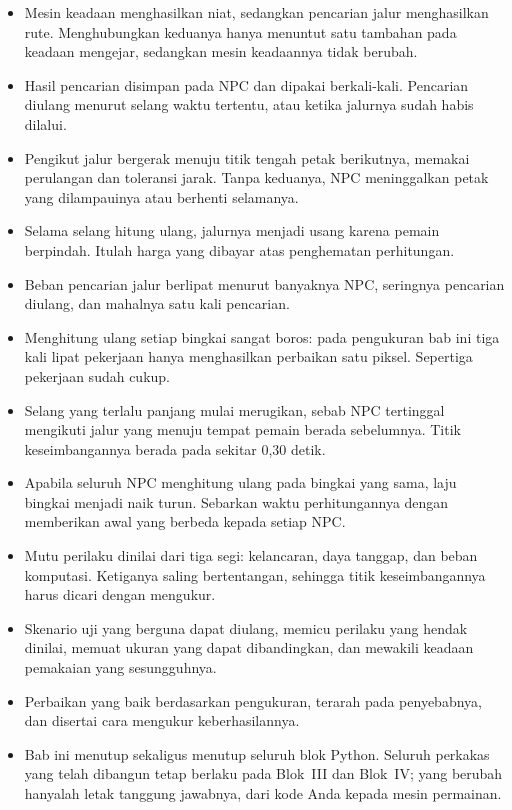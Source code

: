 
\begin{rangkumanbox}
\begin{itemize}
  \item Mesin keadaan menghasilkan niat, sedangkan pencarian jalur menghasilkan
        rute. Menghubungkan keduanya hanya menuntut satu tambahan pada keadaan
        mengejar, sedangkan mesin keadaannya tidak berubah.
  \item Hasil pencarian disimpan pada NPC dan dipakai berkali-kali. Pencarian
        diulang menurut selang waktu tertentu, atau ketika jalurnya sudah habis
        dilalui.
  \item Pengikut jalur bergerak menuju titik tengah petak berikutnya, memakai
        perulangan  dan toleransi jarak. Tanpa keduanya, NPC
        meninggalkan petak yang dilampauinya atau berhenti selamanya.
  \item Selama selang hitung ulang, jalurnya menjadi usang karena pemain
        berpindah. Itulah harga yang dibayar atas penghematan perhitungan.
  \item Beban pencarian jalur berlipat menurut banyaknya NPC, seringnya
        pencarian diulang, dan mahalnya satu kali pencarian.
  \item Menghitung ulang setiap bingkai sangat boros: pada pengukuran bab ini
        tiga kali lipat pekerjaan hanya menghasilkan perbaikan satu piksel.
        Sepertiga pekerjaan sudah cukup.
  \item Selang yang terlalu panjang mulai merugikan, sebab NPC tertinggal
        mengikuti jalur yang menuju tempat pemain berada sebelumnya. Titik
        keseimbangannya berada pada sekitar 0,30 detik.
  \item Apabila seluruh NPC menghitung ulang pada bingkai yang sama, laju
        bingkai menjadi naik turun. Sebarkan waktu perhitungannya dengan
        memberikan awal yang berbeda kepada setiap NPC.
  \item Mutu perilaku dinilai dari tiga segi: kelancaran, daya tanggap, dan
        beban komputasi. Ketiganya saling bertentangan, sehingga titik
        keseimbangannya harus dicari dengan mengukur.
  \item Skenario uji yang berguna dapat diulang, memicu perilaku yang hendak
        dinilai, memuat ukuran yang dapat dibandingkan, dan mewakili keadaan
        pemakaian yang sesungguhnya.
  \item Perbaikan yang baik berdasarkan pengukuran, terarah pada penyebabnya,
        dan disertai cara mengukur keberhasilannya.
  \item Bab ini menutup  sekaligus menutup seluruh blok Python. Seluruh
        perkakas yang telah dibangun tetap berlaku pada Blok~III dan Blok~IV;
        yang berubah hanyalah letak tanggung jawabnya, dari kode Anda kepada
        mesin permainan.
\end{itemize}
\end{rangkumanbox}
